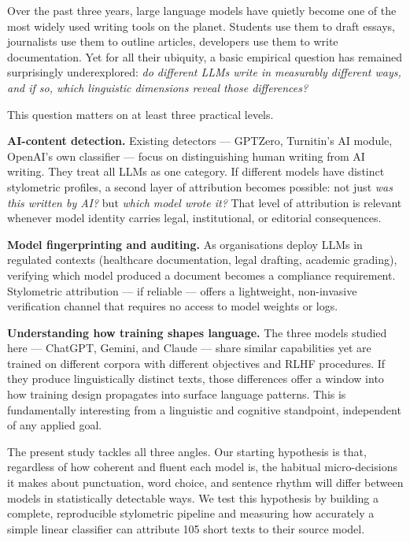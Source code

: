 \documentclass[11pt,a4paper]{article}
\begin{document}
Over the past three years, large language models have quietly become
one of the most widely used writing tools on the planet. Students use
them to draft essays, journalists use them to outline articles,
developers use them to write documentation. Yet for all their
ubiquity, a basic empirical question has remained surprisingly
underexplored: \emph{do different LLMs write in measurably different
ways, and if so, which linguistic dimensions reveal those differences?}

This question matters on at least three practical levels.

\textbf{AI-content detection.} Existing detectors --- GPTZero,
Turnitin's AI module, OpenAI's own classifier --- focus on
distinguishing human writing from AI writing. They treat all LLMs as
one category. If different models have distinct stylometric profiles,
a second layer of attribution becomes possible: not just \emph{was
this written by AI?} but \emph{which model wrote it?} That level of
attribution is relevant whenever model identity carries legal,
institutional, or editorial consequences.

\textbf{Model fingerprinting and auditing.} As organisations deploy
LLMs in regulated contexts (healthcare documentation, legal drafting,
academic grading), verifying which model produced a document becomes
a compliance requirement. Stylometric attribution --- if reliable ---
offers a lightweight, non-invasive verification channel that requires
no access to model weights or logs.

\textbf{Understanding how training shapes language.}
The three models studied here --- ChatGPT, Gemini, and Claude ---
share similar capabilities yet are trained on different corpora with
different objectives and RLHF procedures. If they produce
linguistically distinct texts, those differences offer a window into
how training design propagates into surface language patterns. This
is fundamentally interesting from a linguistic and cognitive
standpoint, independent of any applied goal.

The present study tackles all three angles. Our starting hypothesis is
that, regardless of how coherent and fluent each model is, the
habitual micro-decisions it makes about punctuation, word choice, and
sentence rhythm will differ between models in statistically detectable
ways. We test this hypothesis by building a complete, reproducible
stylometric pipeline and measuring how accurately a simple linear
classifier can attribute 105 short texts to their source model.
\end{document}
